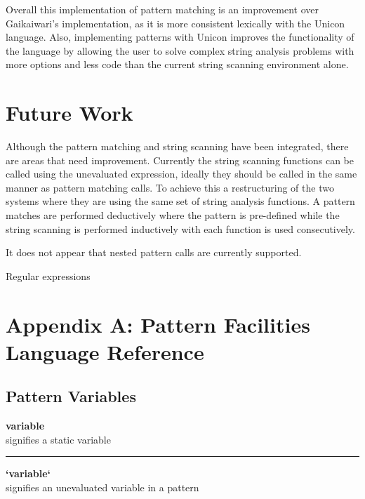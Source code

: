 \documentclass{article}
\begin{document}
Overall this implementation of pattern matching is an improvement over Gaikaiwari's implementation, as it is more consistent lexically with the Unicon language.  Also, implementing patterns with Unicon improves the functionality of the language by allowing the user to solve complex string analysis problems with more options and less code than the current string scanning environment alone.

\section{Future Work}
Although the pattern matching and string scanning have been integrated, there are areas that need improvement.  Currently the string scanning functions can be called using the unevaluated expression, ideally they should be called in the same manner as pattern matching calls.  To achieve this a restructuring of the two systems where they are using the same set of string analysis functions.  A pattern matches are performed deductively where the pattern is pre-defined while the string scanning is performed inductively with each function is used consecutively.

It does not appear that nested pattern calls are currently supported.

Regular expressions


\newpage
  \renewcommand{\theequation}{A-\arabic{equation}}
  \setcounter{equation}{0}  %
\section*{Appendix A: Pattern Facilities Language Reference} 
\subsection*{Pattern Variables}

\textbf{variable} \\
signifies a static variable\\
\noindent\rule{12cm}{0.4pt}
 
\noindent\textbf{`variable`} \\
signifies an unevaluated variable in a pattern\\
\end{document}
